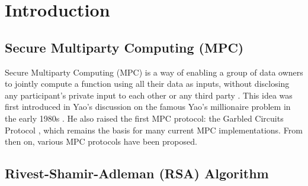 
\chapter{Introduction}

\section{Secure Multiparty Computing (MPC)}

Secure Multiparty Computing (MPC) is a way of enabling a group of data owners to jointly compute a function using all their data as inputs, without disclosing any participant's private input to each other or any third party \cite{evans2018pragmatic}. This idea was first introduced in Yao's discussion on the famous Yao's millionaire problem in the early 1980s \cite{yao1982protocols}. He also raised the first MPC protocol: the Garbled Circuits Protocol \cite{yao1982protocols}, which remains the basis for many current MPC implementations. From then on, various MPC protocols have been proposed.

\section{Rivest-Shamir-Adleman (RSA) Algorithm}

\section{}
